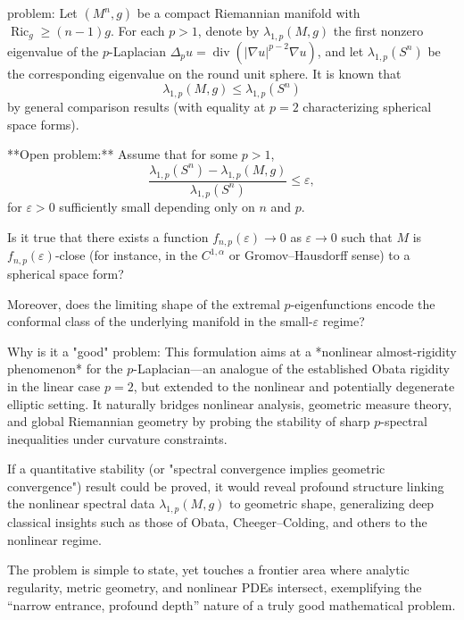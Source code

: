 problem:  
Let \((M^n,g)\) be a compact Riemannian manifold with \(\operatorname{Ric}_g \ge (n-1)g\). For each \(p>1\), denote by \(\lambda_{1,p}(M,g)\) the first nonzero eigenvalue of the \(p\)-Laplacian \(\Delta_p u = \operatorname{div}(|\nabla u|^{p-2}\nabla u)\), and let \(\lambda_{1,p}(S^n)\) be the corresponding eigenvalue on the round unit sphere. It is known that  
\[
\lambda_{1,p}(M,g) \le \lambda_{1,p}(S^n)
\]
by general comparison results (with equality at \(p=2\) characterizing spherical space forms).  

**Open problem:**  
Assume that for some \(p>1\),  
\[
\frac{\lambda_{1,p}(S^n) - \lambda_{1,p}(M,g)}{\lambda_{1,p}(S^n)} \le \varepsilon,
\]
for \(\varepsilon>0\) sufficiently small depending only on \(n\) and \(p\).  

Is it true that there exists a function \(f_{n,p}(\varepsilon)\to 0\) as \(\varepsilon\to 0\) such that \(M\) is \(f_{n,p}(\varepsilon)\)-close (for instance, in the \(C^{1,\alpha}\) or Gromov–Hausdorff sense) to a spherical space form?  

Moreover, does the limiting shape of the extremal \(p\)-eigenfunctions encode the conformal class of the underlying manifold in the small-\(\varepsilon\) regime?  

Why is it a "good" problem:  
This formulation aims at a *nonlinear almost-rigidity phenomenon* for the \(p\)-Laplacian—an analogue of the established Obata rigidity in the linear case \(p=2\), but extended to the nonlinear and potentially degenerate elliptic setting. It naturally bridges nonlinear analysis, geometric measure theory, and global Riemannian geometry by probing the stability of sharp \(p\)-spectral inequalities under curvature constraints.  

If a quantitative stability (or "spectral convergence implies geometric convergence") result could be proved, it would reveal profound structure linking the nonlinear spectral data \(\lambda_{1,p}(M,g)\) to geometric shape, generalizing deep classical insights such as those of Obata, Cheeger–Colding, and others to the nonlinear regime.  

The problem is simple to state, yet touches a frontier area where analytic regularity, metric geometry, and nonlinear PDEs intersect, exemplifying the “narrow entrance, profound depth” nature of a truly good mathematical problem.